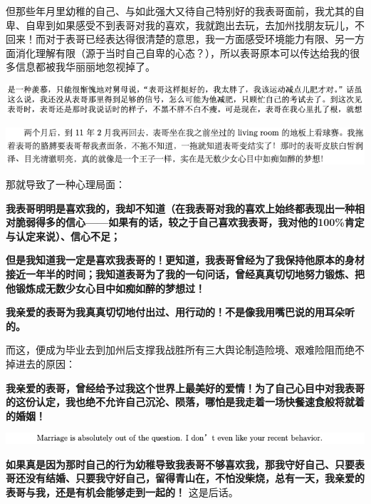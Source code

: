 \documentclass[9pt, b5paper]{article}
\begin{document}
但那些年月里幼稚的自己、与如此强大又待自己特别好的我表哥面前，我尤其的自卑、自卑到如果感受不到表哥对我的喜欢，我就跑出去玩，去加州找朋友玩儿，不回来！而对于表哥已经表达得很清楚的意思，我一方面感受环境能力有限、另一方面消化理解有限（源于当时自己自卑的心态？），所以表哥原本可以传达给我的很多信息都被我华丽丽地忽视掉了。

\begin{center}
\includegraphics[width=.9\linewidth]{./pic/backups_plans_20210426_163310.png}
\end{center}

\begin{center}
\includegraphics[width=.9\linewidth]{./pic/backups_plans_20210426_163417.png}
\end{center}

那就导致了一种心理局面：

\textbf{我表哥明明是喜欢我的，我却不知道（在我表哥对我的喜欢上始终都表现出一种相对脆弱得多的信心——如果有的话，较之于自己喜欢我表哥，我对他的100\%肯定与认定来说）、信心不足；}

\textbf{但是我知道我一定是喜欢我表哥的！更知道，我表哥曾经为了我保持他原本的身材接近一年半的时间；我知道表哥为了我的一句问话，曾经真真切切地努力锻炼、把他锻炼成无数少女心目中如痴如醉的梦想过！}

\textbf{我亲爱的表哥为我真真切切地付出过、用行动的！不是像我用嘴巴说的用耳朵听的。}

而这，便成为毕业去到加州后支撑我战胜所有三大舆论制造险境、艰难险阻而绝不掉进去的原因：

\textbf{我亲爱的表哥，曾经给予过我这个世界上最美好的爱情！为了自己心目中对我表哥的这份认定，我也绝不允许自己沉沦、陨落，哪怕是我走着一场快餐速食般将就着的婚姻！}

\begin{center}
\includegraphics[width=.9\linewidth]{./pic/backups_plans_20210426_165635.png}
\end{center}

\textbf{如果真是因为那时自己的行为幼稚导致我表哥不够喜欢我，那我守好自己、只要表哥还没有结婚、只要我守好自己，留得青山在，不怕没柴烧，总有一天，我亲爱的表哥与我，还是有机会能够走到一起的！} 这是后话。
\end{document}
